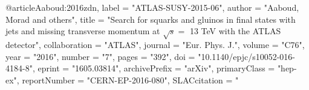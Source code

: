 @article{Aaboud:2016zdn,
      label          = "ATLAS-SUSY-2015-06",
      author         = "Aaboud, Morad and others",
      title          = "{Search for squarks and gluinos in final states with jets
                        and missing transverse momentum at $\sqrt{s} =$ 13 TeV
                        with the ATLAS detector}",
      collaboration  = "ATLAS",
      journal        = "Eur. Phys. J.",
      volume         = "C76",
      year           = "2016",
      number         = "7",
      pages          = "392",
      doi            = "10.1140/epjc/s10052-016-4184-8",
      eprint         = "1605.03814",
      archivePrefix  = "arXiv",
      primaryClass   = "hep-ex",
      reportNumber   = "CERN-EP-2016-080",
      SLACcitation   = "%
}

